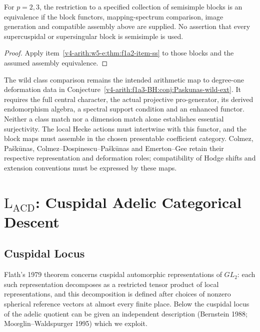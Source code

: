 \begin{corollary}
\label{v4-arith:w5-e:cor:f1a2-ss-uncond}
For $p=2,3$, the restriction to a specified collection of semisimple
blocks is an equivalence if the block functors, mapping-spectrum
comparison, image generation and compatible assembly above are supplied.
No assertion that every supercuspidal or supersingular block is
semisimple is used.
\end{corollary}
\begin{proof}
Apply item~\ref{v4-arith:w5-e:thm:f1a2-item-ss} to those blocks and
the assumed assembly equivalence.
\end{proof}
\begin{remark}
\label{v4-arith:w5-e:rem:f1a2-cond}
The wild class comparison remains the intended
arithmetic map to degree-one deformation data in
Conjecture~\ref{v4-arith:f1a3-BH:conj:Paskunas-wild-ext}.
It requires the full central character, the actual projective
pro-generator, its derived endomorphism algebra, a spectral support
condition and an enhanced functor. Neither a class match nor a
dimension match alone establishes essential surjectivity.
The local Hecke actions must intertwine with this functor, and the
block maps must assemble in the chosen presentable coefficient category.
Colmez, Pa\v{s}k\=unas, Colmez--Dospinescu--Pa\v{s}k\=unas and
Emerton--Gee retain their respective representation and deformation
roles; compatibility of Hodge shifts and extension conventions must
be expressed by these maps.
\end{remark}
\section{\(\mathrm{L}_{\mathrm{ACD}}\): Cuspidal Adelic Categorical Descent}
\label{v4-arith:w5-e:lacd}

\subsection{Cuspidal Locus}

Flath's 1979 theorem concerns cuspidal automorphic representations
of \(GL_{2}\): each such representation decomposes as a restricted
tensor product of local representations, and this decomposition is
defined after choices of nonzero spherical reference vectors at almost every finite place. Below the
cuspidal locus of the adelic quotient can be given an independent
description (Bernstein 1988; Mo{\oe}glin--Waldspurger 1995) which
we exploit.

